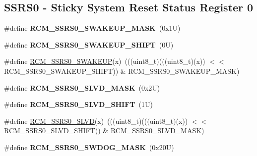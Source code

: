 \subsection*{S\+S\+R\+S0 -\/ Sticky System Reset Status Register 0}
\begin{DoxyCompactItemize}
\item 
\mbox{\label{group___r_c_m___register___masks_ga6128da7897c7bdce29ee2eee0ae0bc87}} 
\#define {\bfseries R\+C\+M\+\_\+\+S\+S\+R\+S0\+\_\+\+S\+W\+A\+K\+E\+U\+P\+\_\+\+M\+A\+SK}~(0x1\+U)
\item 
\mbox{\label{group___r_c_m___register___masks_ga98ba1013002a8184979196adcb4408b2}} 
\#define {\bfseries R\+C\+M\+\_\+\+S\+S\+R\+S0\+\_\+\+S\+W\+A\+K\+E\+U\+P\+\_\+\+S\+H\+I\+FT}~(0\+U)
\item 
\#define \mbox{\hyperlink{group___r_c_m___register___masks_ga6f5784555c275f8d5de1c38a1c21c21d}{R\+C\+M\+\_\+\+S\+S\+R\+S0\+\_\+\+S\+W\+A\+K\+E\+UP}}(x)~(((uint8\+\_\+t)(((uint8\+\_\+t)(x)) $<$$<$ R\+C\+M\+\_\+\+S\+S\+R\+S0\+\_\+\+S\+W\+A\+K\+E\+U\+P\+\_\+\+S\+H\+I\+FT)) \& R\+C\+M\+\_\+\+S\+S\+R\+S0\+\_\+\+S\+W\+A\+K\+E\+U\+P\+\_\+\+M\+A\+SK)
\item 
\mbox{\label{group___r_c_m___register___masks_ga4ccdd15fbf2206f31b4ba3846a21fad9}} 
\#define {\bfseries R\+C\+M\+\_\+\+S\+S\+R\+S0\+\_\+\+S\+L\+V\+D\+\_\+\+M\+A\+SK}~(0x2\+U)
\item 
\mbox{\label{group___r_c_m___register___masks_gaa99b4bc28a736008e9038419d6c2d33a}} 
\#define {\bfseries R\+C\+M\+\_\+\+S\+S\+R\+S0\+\_\+\+S\+L\+V\+D\+\_\+\+S\+H\+I\+FT}~(1\+U)
\item 
\#define \mbox{\hyperlink{group___r_c_m___register___masks_gaf6114784bf50ee42fdb2c4bca0307cc3}{R\+C\+M\+\_\+\+S\+S\+R\+S0\+\_\+\+S\+L\+VD}}(x)~(((uint8\+\_\+t)(((uint8\+\_\+t)(x)) $<$$<$ R\+C\+M\+\_\+\+S\+S\+R\+S0\+\_\+\+S\+L\+V\+D\+\_\+\+S\+H\+I\+FT)) \& R\+C\+M\+\_\+\+S\+S\+R\+S0\+\_\+\+S\+L\+V\+D\+\_\+\+M\+A\+SK)
\item 
\mbox{\label{group___r_c_m___register___masks_ga339ea72658afc4790bf3d63edc9ed39a}} 
\#define {\bfseries R\+C\+M\+\_\+\+S\+S\+R\+S0\+\_\+\+S\+W\+D\+O\+G\+\_\+\+M\+A\+SK}~(0x20\+U)
\item 

\end{DoxyCompactItemize}

